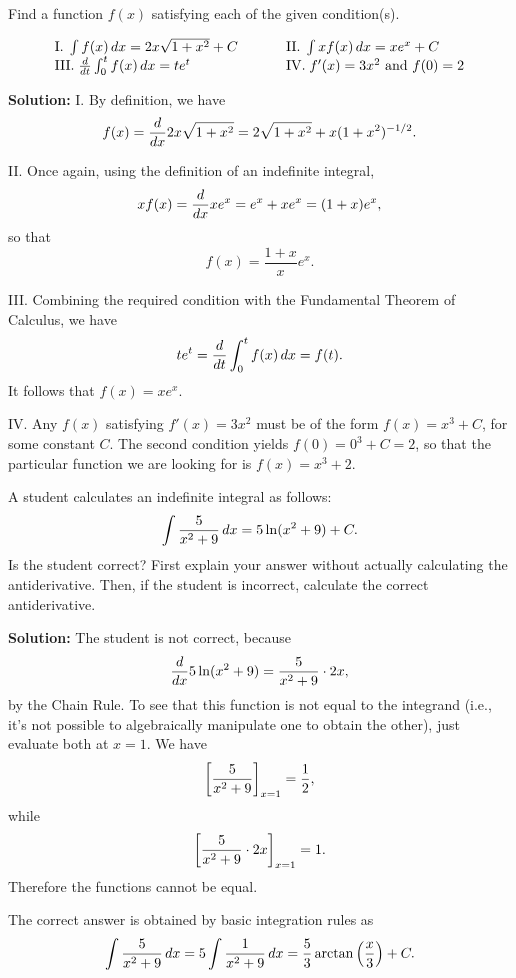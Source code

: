 \documentclass[handout,hints]{ximera}
\begin{document}
\begin{problem}
Find a function $f(x)$ satisfying each of the given condition(s).

$$
\begin{array}{lll}
\mathrm{I.} \; \int f(x) \mathop{}\!d x = 2x \sqrt{1+ x^2} + C & \hspace{.2in} & \mathrm{II.} \; \int xf(x) \mathop{}\!d x = x e^x + C \\
\mathrm{III.} \; \frac{\mathop{}\!d}{\mathop{}\!d t} \int_0^t f(x) \mathop{}\!d x = t e^t & \hspace{.2in} & \mathrm{IV.} \; f'(x) = 3x^2 \mbox{ and } f(0)=2
\end{array}
$$
\end{problem}

\textbf{Solution:} I. By definition, we have
$$
f(x) = \frac{\mathop{}\!d}{\mathop{}\!d x}  2x \sqrt{1+ x^2}  = 2 \sqrt{1+x^2} + x  (1+x^2)^{-1/2}.
$$

II. Once again, using the definition of an indefinite integral, 
$$
x f(x) = \frac{\mathop{}\!d}{\mathop{}\!d x} x e^x = e^x + x e^x = (1+x)e^x,
$$
so that 
$$
f(x) = \frac{1+x}{x} e^x.
$$

III. Combining the required condition with the Fundamental Theorem of Calculus, we have
$$
te^t = \frac{\mathop{}\!d}{\mathop{}\!d t} \int_0^t f(x) \mathop{}\!d x = f(t).
$$
It follows that $f(x) = x e^x$.

IV. Any $f(x)$ satisfying $f'(x) = 3x^2$ must be of the form $f(x) = x^3 + C$, for some constant $C$. The second condition yields $f(0)=0^3 + C = 2$, so that the particular function we are looking for is $f(x) = x^3 + 2$. 

\begin{problem}
A student calculates an indefinite integral as follows:
$$
\int \frac{5}{x^2 + 9} \mathop{}\!d x = 5\ln (x^2 + 9) + C.
$$
Is the student correct? First explain your answer without actually calculating the antiderivative. Then, if the student is incorrect, calculate the correct antiderivative.
\end{problem}

\textbf{Solution:} The student is not correct, because 
$$
\frac{\mathop{}\!d}{\mathop{}\!d x} 5 \ln (x^2 + 9) = \frac{5}{x^2 + 9} \cdot 2x,
$$
by the Chain Rule. To see that this function is not equal to the integrand (i.e., it's not possible to algebraically manipulate one to obtain the other), just evaluate both at $x=1$. We have 
$$
\bigg[ \frac{5}{x^2 + 9} \bigg]_{x=1} = \frac{1}{2},
$$
while 
$$
\bigg[ \frac{5}{x^2 + 9} \cdot 2x \bigg]_{x=1} = 1.
$$
Therefore the functions cannot be equal.

The correct answer is obtained by basic integration rules as
$$
\int \frac{5}{x^2 + 9} \mathop{}\!d x = 5 \int \frac{1}{x^2 + 9} \mathop{}\!d x = \frac{5}{3} \arctan \left(\frac{x}{3}\right) + C.
$$
\end{document}
